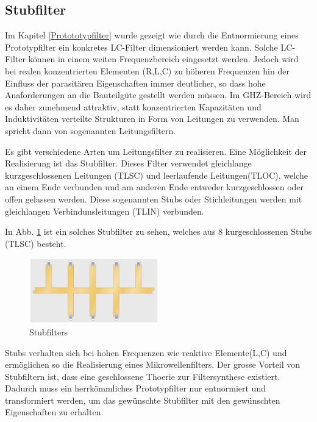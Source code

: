 \subsection{Stubfilter}

Im Kapitel \ref{Protototypfilter} wurde gezeigt wie durch die Entnormierung eines Prototypfilter ein konkretes LC-Filter dimensioniert werden kann. Solche LC-Filter  können in einem weiten Frequenzbereich  eingesetzt  werden.  Jedoch
wird  bei realen konzentrierten Elementen (R,L,C) zu höheren Frequenzen hin der Einfluss der parasitären Eigenschaften immer deutlicher, so dass hohe Anaforderungen an die Bauteilgüte  gestellt  werden  müssen. Im GHZ-Bereich wird es daher  zunehmend attraktiv,  statt  konzentrierten  Kapazitäten  und  Induktivitäten  verteilte
Strukturen  in  Form  von  Leitungen  zu  verwenden.  Man  spricht   dann  von sogenannten Leitungsfiltern.

Es gibt verschiedene Arten um  Leitungsfilter zu realisieren. Eine Möglichkeit der  Realisierung  ist das Stubfilter.  Dieses  Filter  verwendet  gleichlange kurzgeschlossenen Leitungen (TLSC) und  leerlaufende  Leitungen(TLOC), welche an einem Ende verbunden und am anderen Ende entweder kurzgeschlossen
oder offen gelassen werden. Diese sogenannten Stubs oder Stichleitungen werden mit gleichlangen Verbindunsleitungen (TLIN) verbunden. 

In Abb. \ref{fig:Stubfilter} ist ein solches Stubfilter zu sehen, welches aus 8 kurgeschlossenen Stubs (TLSC) besteht.

\begin{figure}[h!]
\centering
 	\includegraphics[width=0.5\textwidth]{Stripline_Stub_Filter.png}
 	\caption{Stubfilters}
 	\label{fig:Stubfilter}
\end{figure}


Stubs verhalten sich bei  hohen  Frequenzen  wie  reaktive Elemente(L,C) und ermöglichen so die Realisierung  eines  Mikrowellenfilters. Der grosse Vorteil von Stubfiltern ist, dass eine geschlossene Thoerie zur Filtersynthese existiert. Dadurch muss ein herrkömmliches Prototypfilter nur entnormiert und transformiert werden, um das gewünschte Stubfilter mit den gewünschten Eigenschaften zu erhalten.

